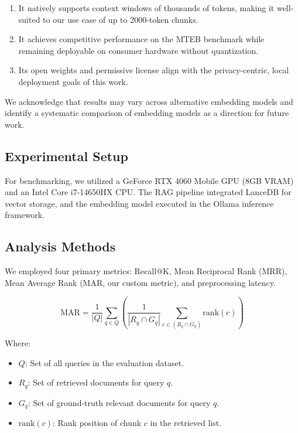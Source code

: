 \documentclass[conference]{IEEEtran}
\begin{document}
\begin{enumerate}
    \item It natively supports context windows of thousands of tokens, making it well-suited to our use case of up to 2000-token chunks.
    \item It achieves competitive performance on the MTEB benchmark while remaining deployable on consumer hardware without quantization.
    \item Its open weights and permissive license align with the privacy-centric, local deployment goals of this work.
\end{enumerate}

We acknowledge that results may vary across alternative embedding models and identify a systematic comparison of embedding models as a direction for future work.

\subsection{Experimental Setup} 

For benchmarking, we utilized a GeForce RTX 4060 Mobile GPU (8GB VRAM) and an Intel Core i7-14650HX CPU. The RAG pipeline integrated LanceDB\cite{lancedb} for vector storage, and the embedding model executed in the Ollama\cite{ollama} inference framework.

\subsection{Analysis Methods}
\label{subsec:am}

We employed four primary metrics: Recall@K, Mean Reciprocal Rank (MRR), Mean Average Rank (MAR, our custom metric), and preprocessing latency. 

\[\text{MAR}=\frac{1}{|Q|} \sum_{q \in Q} \left( \frac{1}{|R_q \cap G_q|} \sum_{c \in (R_q \cap G_q)} \text{rank}(c)\right) \]

\noindent Where:
\begin{itemize}
    \item $Q$: Set of all queries in the evaluation dataset.
    \item $R_q$: Set of retrieved documents for query $q$.
    \item $G_q$: Set of ground-truth relevant documents for query $q$.
    \item $\text{rank}(c)$: Rank position of chunk $c$ in the retrieved list.
\end{itemize}
\end{document}
